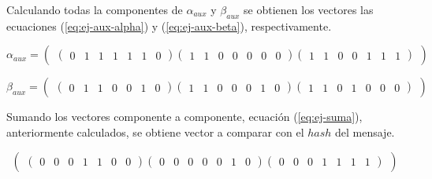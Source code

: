 Calculando todas la componentes de $\alpha_{aux}$ y $\beta_{aux}$ se obtienen los vectores las ecuaciones (\ref{eq:ej-aux-alpha}) y (\ref{eq:ej-aux-beta}), respectivamente.

\begin{equation}\label{eq:ej-aux-alpha}
	{\alpha_{aux}} = \left(\begin{matrix}
		\left(\begin{smallmatrix}0 & 1 & 1 & 1 & 1 & 1 & 0\end{smallmatrix}\right)
		\left(\begin{smallmatrix}1 & 1 & 0 & 0 & 0 & 0 & 0\end{smallmatrix}\right)
		\left(\begin{smallmatrix}1 & 1 & 0 & 0 & 1 & 1 & 1\end{smallmatrix}\right)
		\end{matrix}\right)
\end{equation}

\begin{equation}\label{eq:ej-aux-beta}
	{\beta_{aux}} =
		\left(\begin{matrix}
			\left(\begin{smallmatrix}0 & 1 & 1 & 0 & 0 & 1 & 0\end{smallmatrix}\right)		
			\left(\begin{smallmatrix}1 & 1 & 0 & 0 & 0 & 1 & 0\end{smallmatrix}\right)
			\left(\begin{smallmatrix}1 & 1 & 0 & 1 & 0 & 0 & 0\end{smallmatrix}\right)
		\end{matrix}\right)
\end{equation}

Sumando los vectores componente a componente, ecuación (\ref{eq:ej-suma}), anteriormente calculados, se obtiene vector a comparar con el $hash$ del mensaje. 

\begin{equation}\label{eq:ej-suma}
	\left(\begin{matrix}
		\left(\begin{smallmatrix}0 & 0 & 0 & 1 & 1 & 0 & 0\end{smallmatrix}\right)
		\left(\begin{smallmatrix}0 & 0 & 0 & 0 & 0 & 1 & 0\end{smallmatrix}\right)
		\left(\begin{smallmatrix}0 & 0 & 0 & 1 & 1 & 1 & 1\end{smallmatrix}\right)
	\end{matrix}\right)
\end{equation}

